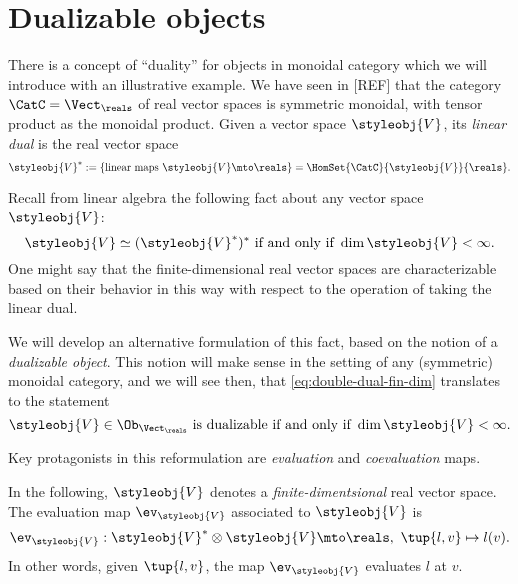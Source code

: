 

\section{Dualizable objects}
\label{sec:dual-objects}


There is a concept of ``duality'' for objects in monoidal category which we will introduce with an illustrative example. We have seen in [REF] that the category $\CatC = \Vect_{\reals}$ of real vector spaces is symmetric monoidal, with tensor product as the monoidal product. Given a vector space $\styleobj{V} $, its \emph{linear dual} is the real vector space
\begin{equation}
    \label{eq:lin-dual-vecsp}
    \styleobj{V} ^{*} := \{ \text{linear maps } \styleobj{V} \mto \reals \} = \HomSet{\CatC}{\styleobj{V}}{ \reals}.
\end{equation}

Recall from linear algebra the following fact about any vector space $\styleobj{V} $:
\begin{equation}
    \label{eq:double-dual-fin-dim}
    \styleobj{V}  \simeq (\styleobj{V} ^{*})^* \text{ if and only if } \dim \styleobj{V}  < \infty.
\end{equation}
One might say that the finite-dimensional real vector spaces are characterizable based on their behavior in this way with respect to the operation of taking the linear dual.

We will develop an alternative formulation of this fact, based on the notion of a \emph{dualizable object}. This notion will make sense in the setting of any (symmetric) monoidal category, and we will see then, that \cref{eq:double-dual-fin-dim} translates to the statement
\begin{equation}
    \label{eq:dualizable-fin-dim}
    \styleobj{V}  \in \Ob_{\Vect_\reals} \text{ is dualizable if and only if } \dim \styleobj{V}  < \infty.
\end{equation}

Key protagonists in this reformulation are \emph{evaluation} and \emph{coevaluation} maps.

In the following,  $\styleobj{V} $ denotes a \emph{finite-dimentsional} real vector space. The evaluation map $\ev_\styleobj{V} $ associated to $\styleobj{V} $ is
\begin{equation}
    \label{eq:evaluation-vecsp}
    \ev_\styleobj{V}  : \styleobj{V}^* \otimes \styleobj{V}  \mto \reals, \ \tup{l, v} \mapsto l(v).
\end{equation}
In other words, given $\tup{l, v}$, the map $\ev_\styleobj{V} $ evaluates $l$ at $v$.


